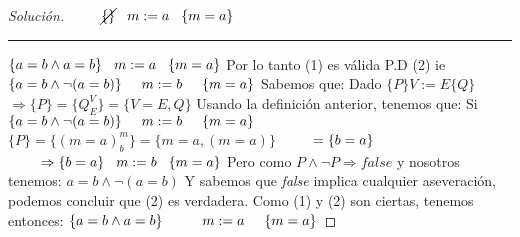 \begin{proof}[Solución]
\newline
$ \hspace*{0.8cm} \cancel{\{ \}} \hspace*{0.3cm} m:=a \hspace*{0.3cm} \{ m=a \} $
\newline
\noindent\rule{6cm}{0.4pt}
\newline
$ \{a=b \wedge a=b \} \hspace*{0.3cm}  m:=a \hspace*{.3cm} \{m=a \}$
\vspace*{0.3cm}
\newline
Por lo tanto (1) es válida
\vspace*{0.5cm}
\newline
P.D (2) ie $\{a=b \wedge \neg (a=b) \} \hspace*{.5cm}  m:=b \hspace*{.5cm} \{m=a \}  $ 
\newline
Sabemos que:
\newline
Dado $\{P\} V:=E \{Q\}$
\newline
$\Rightarrow  \{P\} = \{Q_{E}^{V} \} = \{V=E, Q \} $
\vspace*{0.3cm}
\newline
Usando la definición anterior, tenemos que:
Si $\{a=b \wedge \neg (a=b) \} \hspace*{.5cm}  m:=b \hspace*{.5cm} \{m=a \} $  
\newline
$ \{ P \} = \{ (m=a)_{b}^{m}   \} = \{m=a,(m=a)\} $
\newline
$ \hspace*{0.8cm} = \{ b=a \} $
\newline
$ \hspace*{0.8cm} \Rightarrow  \{ b=a \} \hspace*{0.3cm} m:=b \hspace*{0.3cm} \{ m=a \} $
\vspace*{0.3cm}
\newline
Pero como $P \wedge \neg P \Rightarrow false $ y nosotros tenemos: $a=b \wedge \neg (a=b) $
\newline 
Y sabemos que \emph{false} implica cualquier aseveración, podemos concluir que (2) es verdadera.
\vspace*{0.3cm}
\newline
Como (1) y (2) son ciertas, tenemos entonces:
\vspace*{0.3cm}
\newline
$ \{a=b \wedge a=b \} \hspace*{1cm}  m:=a \hspace*{.5cm} \{m=a \} $

\end{proof}
